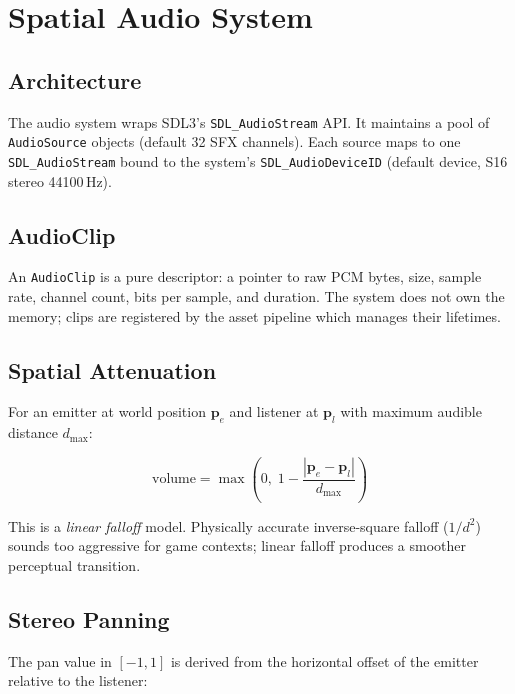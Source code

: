 \chapter{Spatial Audio System}

\section{Architecture}

The audio system wraps SDL3's \texttt{SDL\_AudioStream} API. It maintains
a pool of \texttt{AudioSource} objects (default 32 SFX channels).
Each source maps to one \texttt{SDL\_AudioStream} bound to the system's
\texttt{SDL\_AudioDeviceID} (default device, S16 stereo 44100\,Hz).

\section{AudioClip}

An \texttt{AudioClip} is a pure descriptor: a pointer to raw PCM bytes,
size, sample rate, channel count, bits per sample, and duration.
The system does not own the memory; clips are registered by the asset
pipeline which manages their lifetimes.

\section{Spatial Attenuation}

For an emitter at world position $\mathbf{p}_e$ and listener at
$\mathbf{p}_l$ with maximum audible distance $d_\text{max}$:

\begin{equation}
\text{volume} = \max\!\left(0,\; 1 - \frac{|\mathbf{p}_e - \mathbf{p}_l|}{d_\text{max}}\right)
\label{eq:audio-volume}
\end{equation}

This is a \emph{linear falloff} model. Physically accurate inverse-square
falloff ($1/d^2$) sounds too aggressive for game contexts; linear falloff
produces a smoother perceptual transition.

\section{Stereo Panning}

The pan value in $[-1, 1]$ is derived from the horizontal offset of the
emitter relative to the listener:

